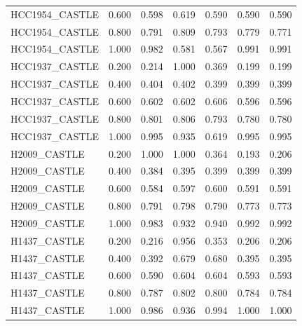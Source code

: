 \documentclass[pdflatex,sn-nature]{sn-jnl}
\begin{document}
\begin{small}
\begin{longtable}{@{}llccccc@{}}
  HCC1954\_CASTLE & 0.600 & 0.598 & 0.619 & 0.590 & 0.590 & 0.590 \\
  HCC1954\_CASTLE & 0.800 & 0.791 & 0.809 & 0.793 & 0.779 & 0.771 \\
  HCC1954\_CASTLE & 1.000 & 0.982 & 0.581 & 0.567 & 0.991 & 0.991 \\
  \addlinespace
  HCC1937\_CASTLE & 0.200 & 0.214 & 1.000 & 0.369 & 0.199 & 0.199 \\
  HCC1937\_CASTLE & 0.400 & 0.404 & 0.402 & 0.399 & 0.399 & 0.399 \\
  HCC1937\_CASTLE & 0.600 & 0.602 & 0.602 & 0.606 & 0.596 & 0.596 \\
  HCC1937\_CASTLE & 0.800 & 0.801 & 0.806 & 0.793 & 0.780 & 0.780 \\
  HCC1937\_CASTLE & 1.000 & 0.995 & 0.935 & 0.619 & 0.995 & 0.995 \\
  \addlinespace
  H2009\_CASTLE & 0.200 & 1.000 & 1.000 & 0.364 & 0.193 & 0.206 \\
  H2009\_CASTLE & 0.400 & 0.384 & 0.395 & 0.399 & 0.399 & 0.399 \\
  H2009\_CASTLE & 0.600 & 0.584 & 0.597 & 0.600 & 0.591 & 0.591 \\
  H2009\_CASTLE & 0.800 & 0.791 & 0.798 & 0.790 & 0.773 & 0.773 \\
  H2009\_CASTLE & 1.000 & 0.983 & 0.932 & 0.940 & 0.992 & 0.992 \\
  \addlinespace
  H1437\_CASTLE & 0.200 & 0.216 & 0.956 & 0.353 & 0.206 & 0.206 \\
  H1437\_CASTLE & 0.400 & 0.392 & 0.679 & 0.680 & 0.395 & 0.395 \\
  H1437\_CASTLE & 0.600 & 0.590 & 0.604 & 0.604 & 0.593 & 0.593 \\
  H1437\_CASTLE & 0.800 & 0.787 & 0.802 & 0.800 & 0.784 & 0.784 \\
  H1437\_CASTLE & 1.000 & 0.986 & 0.936 & 0.994 & 1.000 & 1.000 \\
\end{longtable}
\end{small}
\end{document}

